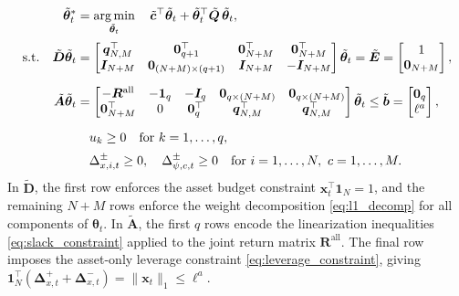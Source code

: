 \begin{equation} \label{eq:joint_qp}
\begin{aligned}
    \tilde{\bm{\theta}}_t^* &= \operatorname*{arg\,min}_{\tilde{\bm{\theta}}_t} \quad
    \tilde{\bm{c}}^\top \tilde{\bm{\theta}}_t + \tilde{\bm{\theta}}_t^\top \tilde{\bm{Q}}\, \tilde{\bm{\theta}}_t, \\[2pt]
    \text{s.t.} \quad
    \tilde{\bm{D}} \tilde{\bm{\theta}}_t &=
    \begin{bmatrix} \bm{q}_{N,M}^\top & \bm{0}_{q+1}^\top & \bm{0}_{N+M}^\top & \bm{0}_{N+M}^\top \\
    \bm{I}_{N+M} & \bm{0}_{(N+M) \times (q+1)} & \bm{I}_{N+M} & -\bm{I}_{N+M} \end{bmatrix} \tilde{\bm{\theta}}_t
    = \tilde{\bm{E}} = \begin{bmatrix} 1 \\ \bm{0}_{N+M} \end{bmatrix}, \\[6pt]
    \tilde{\bm{A}} \tilde{\bm{\theta}}_t &=
    \begin{bmatrix} -\bm{R}^{\text{all}} & -\bm{1}_q & -\bm{I}_q & \bm{0}_{q \times (N+M)} & \bm{0}_{q \times (N+M)} \\
    \bm{0}_{N+M}^\top & 0 & \bm{0}_q^\top & \bm{q}_{N,M}^\top & \bm{q}_{N,M}^\top \end{bmatrix} \tilde{\bm{\theta}}_t
    \le \tilde{\bm{b}} = \begin{bmatrix} \bm{0}_q \\ \ell^a \end{bmatrix}, \\[6pt]
    & \quad u_k \ge 0 \quad \text{for } k = 1, \dots, q, \\[2pt]
    & \quad \Delta_{x,i,t}^\pm \ge 0,\quad \Delta_{\psi,c,t}^\pm \ge 0
    \quad \text{for } i = 1, \dots, N,\ c = 1, \dots, M.
\end{aligned}
\end{equation}
In $\tilde{\bm{D}}$, the first row enforces the asset budget constraint $\bm{x}_t^\top \bm{1}_N = 1$,
and the remaining $N+M$ rows enforce the weight decomposition \eqref{eq:l1_decomp} for
all components of $\bm{\theta}_t$. In $\tilde{\bm{A}}$, the first $q$ rows encode the linearization
inequalities \eqref{eq:slack_constraint} applied to the joint return matrix $\bm{R}^{\text{all}}$.
The final row imposes the asset-only leverage constraint
\eqref{eq:leverage_constraint}, giving $\bm{1}_N^\top(\bm{\Delta}_{x,t}^+ + \bm{\Delta}_{x,t}^-) = \|\bm{x}_t\|_1 \le \ell^a$.

